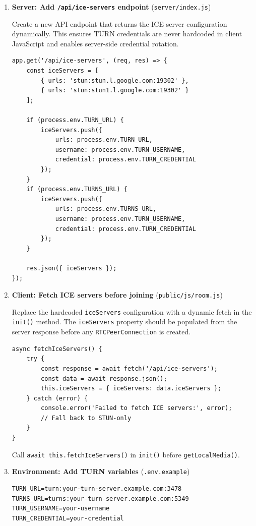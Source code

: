 \documentclass[11pt,letterpaper]{article}
\begin{document}
\begin{enumerate}[leftmargin=2em]
    \item \textbf{Server: Add \texttt{/api/ice-servers} endpoint} (\texttt{server/index.js})

    Create a new API endpoint that returns the ICE server configuration dynamically. This ensures TURN credentials are never hardcoded in client JavaScript and enables server-side credential rotation.

    \begin{verbatim}
app.get('/api/ice-servers', (req, res) => {
    const iceServers = [
        { urls: 'stun:stun.l.google.com:19302' },
        { urls: 'stun:stun1.l.google.com:19302' }
    ];

    if (process.env.TURN_URL) {
        iceServers.push({
            urls: process.env.TURN_URL,
            username: process.env.TURN_USERNAME,
            credential: process.env.TURN_CREDENTIAL
        });
    }
    if (process.env.TURNS_URL) {
        iceServers.push({
            urls: process.env.TURNS_URL,
            username: process.env.TURN_USERNAME,
            credential: process.env.TURN_CREDENTIAL
        });
    }

    res.json({ iceServers });
});
    \end{verbatim}

    \item \textbf{Client: Fetch ICE servers before joining} (\texttt{public/js/room.js})

    Replace the hardcoded \texttt{iceServers} configuration with a dynamic fetch in the \texttt{init()} method. The \texttt{iceServers} property should be populated from the server response before any \texttt{RTCPeerConnection} is created.

    \begin{verbatim}
async fetchIceServers() {
    try {
        const response = await fetch('/api/ice-servers');
        const data = await response.json();
        this.iceServers = { iceServers: data.iceServers };
    } catch (error) {
        console.error('Failed to fetch ICE servers:', error);
        // Fall back to STUN-only
    }
}
    \end{verbatim}

    Call \texttt{await this.fetchIceServers()} in \texttt{init()} before \texttt{getLocalMedia()}.

    \item \textbf{Environment: Add TURN variables} (\texttt{.env.example})

    \begin{verbatim}
TURN_URL=turn:your-turn-server.example.com:3478
TURNS_URL=turns:your-turn-server.example.com:5349
TURN_USERNAME=your-username
TURN_CREDENTIAL=your-credential
    \end{verbatim}
\end{enumerate}
\end{document}
